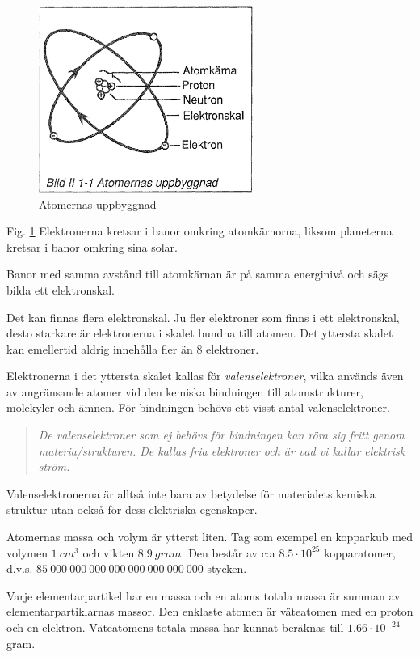 \begin{figure}[th]
\begin{center}
\includegraphics[width=7cm]{images/bild_2_1-01}
\caption{Atomernas uppbyggnad}
\label{fig:BildII1-1}
\end{center}
\end{figure}

Fig. \ref{fig:BildII1-1}
Elektronerna kretsar i banor omkring atomkärnorna, liksom
planeterna kretsar i banor omkring sina solar.

Banor med samma avstånd till atomkärnan är på samma energinivå och sägs bilda
ett elektronskal.

Det kan finnas flera elektronskal. Ju fler elektroner som finns i ett
elektronskal, desto starkare är elektronerna i skalet bundna till atomen. Det
yttersta skalet kan emellertid aldrig innehålla fler än 8 elektroner.

Elektronerna i det yttersta skalet kallas för \emph{valenselektroner}, vilka
används även av angränsande atomer vid den kemiska bindningen till
atomstrukturer, molekyler och ämnen. För bindningen behövs ett visst antal
valenselektroner.

\begin{quote}\emph{
De valenselektroner som ej behövs för bindningen kan röra sig fritt genom
materia/strukturen. De kallas fria elektroner och är vad vi kallar elektrisk ström.
}\end{quote}

Valenselektronerna är alltså inte bara av betydelse för materialets kemiska
struktur utan också för dess elektriska egenskaper.

Atomernas massa och volym är ytterst liten. Tag som exempel en kopparkub med
volymen \(1\ cm^3\) och vikten \(8.9\ gram\). Den består av c:a \(8.5 \cdot 10^{25}\)
kopparatomer, d.v.s. \(85\ 000\ 000\ 000\ 000\ 000\ 000\ 000\ 000\) stycken.

Varje elementarpartikel har en massa och en atoms totala massa är summan av
elementarpartiklarnas massor. Den enklaste atomen är väteatomen med en proton
och en elektron. Väteatomens totala massa har kunnat beräknas till \(1.66 \cdot 10^{-24}\) gram.

